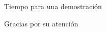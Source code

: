 \documentclass{beamer}
\begin{document}




	\begin{frame}
		\Huge{\centerline{Tiempo para una demostración}}
	\end{frame}
	\begin{frame}
		\Huge{\centerline{Gracias por su atención}}
	\end{frame}
\end{document}
